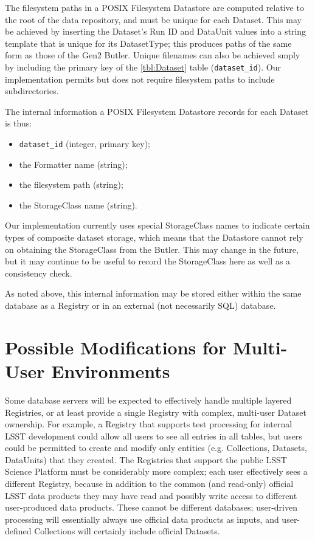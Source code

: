 \documentclass[DM,toc]{lsstdoc}
\begin{document}
The filesystem paths in a POSIX Filesystem Datastore are computed relative to the root of the data repository, and must be unique for each Dataset.
This may be achieved by inserting the Dataset's Run ID and DataUnit values into a string template that is unique for its DatasetType; this produces paths of the same form as those of the Gen2 Butler.
Unique filenames can also be achieved smply by including the primary key of the \ref{tbl:Dataset} table (\texttt{dataset\_id}).
Our implementation permits but does not require filesystem paths to include subdirectories.

The internal information a POSIX Filesystem Datastore records for each Dataset is thus:
\begin{itemize}
\item \texttt{dataset\_id} (integer, primary key);
\item the Formatter name (string);
\item the filesystem path (string);
\item the StorageClass name (string).
\end{itemize}
Our implementation currently uses special StorageClass names to indicate certain types of composite dataset storage, which means that the Datastore cannot rely on obtaining the StorageClass from the Butler.
This may change in the future, but it may continue to be useful to record the StorageClass here as well as a consistency check.

As noted above, this internal information may be stored either within the same database as a Registry or in an external (not necessarily SQL) database.

\appendix

\section{Possible Modifications for Multi-User Environments}
\label{sec:multi-user-environments}

Some database servers will be expected to effectively handle multiple layered Registries, or at least provide a single Registry with complex, multi-user Dataset ownership.
For example, a Registry that supports test processing for internal LSST development could allow all users to see all entries in all tables, but users could be permitted to create and modify only entities (e.g. Collections, Datasets, DataUnits) that they created.
The Registries that support the public LSST Science Platform must be considerably more complex; each user effectively sees a different Registry, because in addition to the common (and read-only) official LSST data products they may have read and possibly write access to different user-produced data products.
These cannot be different databases; user-driven processing will essentially always use official data products as inputs, and user-defined Collections will certainly include official Datasets.
\end{document}
